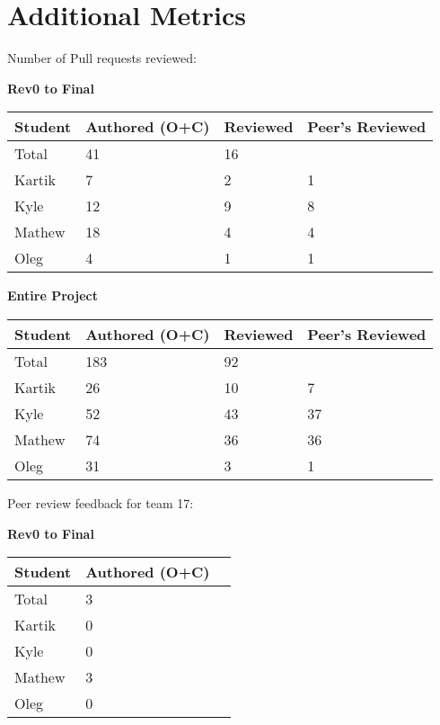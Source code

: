 \documentclass{article}
\begin{document}

\section{Additional Metrics}
Number of Pull requests reviewed:


\begin{table}[H]
    \centering
    \textbf{Rev0 to Final}\\
    \begin{tabular}{llll}
    \toprule
    \textbf{Student} & \textbf{Authored (O+C)} & \textbf{Reviewed} & \textbf{Peer's Reviewed}\\
    \midrule
    Total & 41 & 16 & \\
    Kartik & 7 & 2 & 1\\
    Kyle   & 12 & 9 & 8\\
    Mathew & 18 & 4 & 4\\
    Oleg   & 4 & 1 & 1\\
    \bottomrule
    \end{tabular}
    \end{table}


\begin{table}[H]
    \centering
    \textbf{Entire Project}\\
    \begin{tabular}{llll}
    \toprule
    \textbf{Student} & \textbf{Authored (O+C)} & \textbf{Reviewed} & \textbf{Peer's Reviewed}\\
    \midrule
    Total & 183 & 92 & \\
    Kartik & 26 & 10 & 7\\
    Kyle   & 52 & 43 & 37\\
    Mathew & 74 & 36 & 36\\
    Oleg   & 31 & 3 & 1\\
    \bottomrule
    \end{tabular}
    \end{table}

Peer review feedback for team 17:

\begin{table}[H]
    \centering
    \textbf{Rev0 to Final}\\
    \begin{tabular}{lll}
    \toprule
    \textbf{Student} & \textbf{Authored (O+C)}\\
    \midrule
    Total & 3\\
    Kartik & 0\\
    Kyle   & 0 \\
    Mathew & 3 \\
    Oleg   & 0 \\
    
    \bottomrule
    \end{tabular}
    \end{table}
\end{document}
